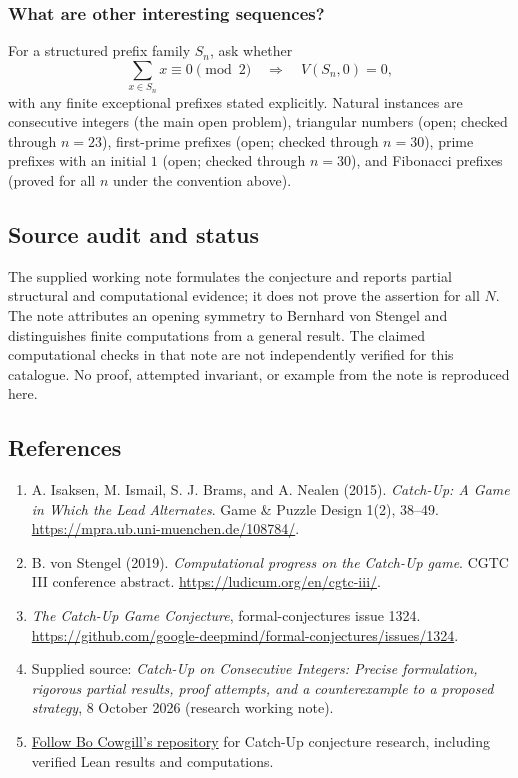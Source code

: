 \documentclass[11pt,a4paper]{article}
\begin{document}
\subsubsection*{What are other interesting sequences?}
For a structured prefix family $S_n$, ask whether
\[
\sum_{x\in S_n}x\equiv0\pmod2
\quad\Longrightarrow\quad
V(S_n,0)=0,
\]
with any finite exceptional prefixes stated explicitly.  Natural instances are consecutive integers (the main open problem), triangular numbers (open; checked through $n=23$), first-prime prefixes (open; checked through $n=30$), prime prefixes with an initial $1$ (open; checked through $n=30$), and Fibonacci prefixes (proved for all $n$ under the convention above).


\subsection*{Source audit and status}

The supplied working note formulates the conjecture and reports partial
structural and computational evidence; it does not prove the assertion
for all $N$. The note attributes an opening symmetry to Bernhard von
Stengel and distinguishes finite computations from a general result.
The claimed computational checks in that note are not independently
verified for this catalogue. No proof, attempted invariant, or example
from the note is reproduced here.

\subsection*{References}

\begin{enumerate}
	\item[S1] A. Isaksen, M. Ismail, S. J. Brams, and A. Nealen (2015).
	\emph{Catch-Up: A Game in Which the Lead Alternates}.
	Game \& Puzzle Design 1(2), 38--49.
	\url{https://mpra.ub.uni-muenchen.de/108784/}.
	\item[S2] B. von Stengel (2019). \emph{Computational progress on the Catch-Up game}.
	CGTC III conference abstract. \url{https://ludicum.org/en/cgtc-iii/}.
	\item[S3] \emph{The Catch-Up Game Conjecture}, formal-conjectures issue 1324.
	\url{https://github.com/google-deepmind/formal-conjectures/issues/1324}.
	\item[S4] Supplied source: \emph{Catch-Up on Consecutive Integers: Precise
		formulation, rigorous partial results, proof attempts, and a counterexample
		to a proposed strategy}, 8 October 2026 (research working note).
\item[S5] \href{https://github.com/bocowgill-collaborations/catch-up-research}{Follow Bo Cowgill's repository} for Catch-Up conjecture research, including verified Lean results and computations.
\end{enumerate}
\end{document}
